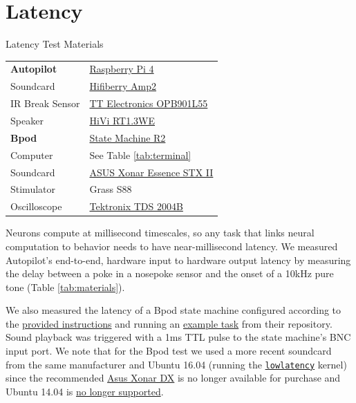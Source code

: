 
\section{Latency}
\label{sec:latency}

\begin{margintable}[1.5cm]
\caption{Latency Test Materials}
\label{tab:materials}
\noindent\begin{tabularx}{\linewidth}{lX}%
\toprule
\textbf{Autopilot} & \href{https://www.raspberrypi.org/products/raspberry-pi-4-model-b/}{Raspberry Pi 4}\\
Soundcard & \href{https://www.hifiberry.com/shop/boards/hifiberry-amp2/}{Hifiberry Amp2} \\
IR Break Sensor & \href{https://www.digikey.com/product-detail/en/tt-electronics-optek-technology/OPB901L55/365-1767-ND/1637490}{TT Electronics OPB901L55}\\
Speaker & \href{https://www.parts-express.com/hivi-rt13we-isodynamic-tweeter--297-421}{HiVi RT1.3WE}\\
\midrule
\textbf{Bpod} & \href{https://sanworks.io/shop/viewproduct?productID=1024}{State Machine R2}\\
Computer & See Table \ref{tab:terminal}\\
Soundcard & \href{https://www.asus.com/Sound-Cards/Essence_STX_II_71/}{ASUS Xonar Essence STX II}\\
Stimulator & Grass S88 \\
\midrule
Oscilloscope & \href{https://download.tek.com/manual/071181702web.pdf}{Tektronix TDS 2004B}\\
\bottomrule
\end{tabularx}
\end{margintable}


Neurons compute at millisecond timescales, so any task that links neural computation to behavior needs to have near-millisecond latency. We measured Autopilot's end-to-end, hardware input to hardware output latency by measuring the delay between a poke in a nosepoke sensor and the onset of a 10kHz pure tone (Table \ref{tab:materials}). 

We also measured the latency of a Bpod state machine configured according to the \href{https://sites.google.com/site/bpoddocumentation/installing-bpod/ubuntu14}{provided instructions} and running an \href{https://github.com/sanworks/Bpod_Gen2/blob/master/Examples/Protocols/PsychToolboxSound/PsychToolboxSound.m}{example task} from their repository. Sound playback was triggered with a 1ms TTL pulse to the state machine's BNC input port. We note that for the Bpod test we used a more recent soundcard from the same manufacturer and Ubuntu 16.04 (running the \href{https://help.ubuntu.com/community/UbuntuStudio/RealTimeKernel}{\texttt{lowlatency}} kernel) since the recommended \href{https://www.asus.com/us/Sound-Cards/Xonar_DX/}{Asus Xonar DX} is no longer available for purchase and Ubuntu 14.04 is \href{https://ubuntu.com/blog/ubuntu-14-04-trusty-tahr}{no longer supported}.

